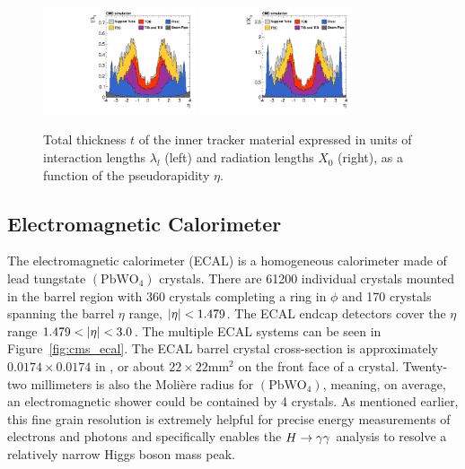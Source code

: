 \begin{figure}[htbp]
\centering
     \includegraphics[width=0.4\textwidth]{cms_and_lhc/plots/cms_tracker_thickness_radiationL.pdf}
     \includegraphics[width=0.4\textwidth]{cms_and_lhc/plots/cms_tracker_thickness_interactionL.pdf}
     \caption{
Total thickness $t$ of the inner tracker material expressed in units of interaction lengths 
$\lambda_{l}$ (left) and radiation lengths $X_{0}$ (right), as a function of the pseudorapidity $\eta$.
     }
     \label{fig:cms_tracker_thickness}
\end{figure}



\subsection{Electromagnetic Calorimeter}
The electromagnetic calorimeter (ECAL) is a homogeneous calorimeter made of lead 
tungstate $(\textrm{PbWO}_{4})$ crystals. There are 61200 individual crystals mounted
in the barrel region with 360 crystals completing a ring in $\phi$ and 170 crystals
spanning the barrel $\eta$ range, $\lvert\eta\rvert < 1.479$. 
The ECAL endcap detectors cover the $\eta$ range $1.479 < \lvert\eta\rvert < 3.0$. The multiple
ECAL systems can be seen in Figure~\ref{fig:cms_ecal}.
The ECAL barrel crystal cross-section is approximately $0.0174 \times 0.0174$ 
in \etaphi, or about $22 \times 22 \textrm{mm}^{2}$
on the front face of a crystal. Twenty-two millimeters is also the Moli\`ere radius
for $(\textrm{PbWO}_{4})$, meaning, on average, an electromagnetic shower could be
contained by 4 crystals. As mentioned earlier, this fine grain resolution is extremely
helpful for precise energy measurements of electrons and photons and specifically
enables the $H \to \gamma\gamma$ analysis to resolve a relatively narrow Higgs
boson mass peak. 

